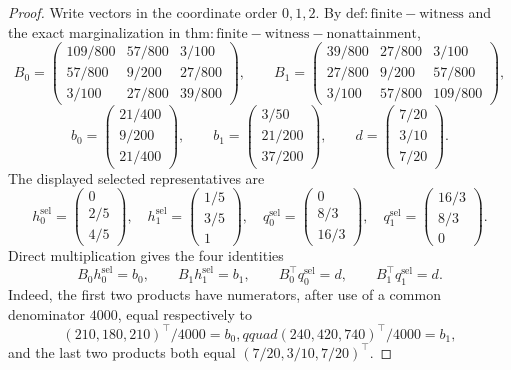 \documentclass{article}
\begin{document}
\begin{proof}
Write vectors in the coordinate order \(0,1,2\).  By \(\mathrm{def:finite-witness}\) and the exact marginalization in \(\mathrm{thm:finite-witness-nonattainment}\),
\[
B_0=\begin{pmatrix}
109/800&57/800&3/100\\
57/800&9/200&27/800\\
3/100&27/800&39/800
\end{pmatrix},\qquad
B_1=\begin{pmatrix}
39/800&27/800&3/100\\
27/800&9/200&57/800\\
3/100&57/800&109/800
\end{pmatrix},
\]
\[
b_0=\begin{pmatrix}21/400\\9/200\\21/400\end{pmatrix},\qquad
b_1=\begin{pmatrix}3/50\\21/200\\37/200\end{pmatrix},\qquad
d=\begin{pmatrix}7/20\\3/10\\7/20\end{pmatrix}.
\]
The displayed selected representatives are
\[
h_0^{\mathrm{sel}}=\begin{pmatrix}0\\2/5\\4/5\end{pmatrix},\quad
h_1^{\mathrm{sel}}=\begin{pmatrix}1/5\\3/5\\1\end{pmatrix},\quad
q_0^{\mathrm{sel}}=\begin{pmatrix}0\\8/3\\16/3\end{pmatrix},\quad
q_1^{\mathrm{sel}}=\begin{pmatrix}16/3\\8/3\\0\end{pmatrix}.
\]
Direct multiplication gives the four identities
\[
B_0h_0^{\mathrm{sel}}=b_0,\qquad
B_1h_1^{\mathrm{sel}}=b_1,
\qquad
B_0^\top q_0^{\mathrm{sel}}=d,\qquad
B_1^\top q_1^{\mathrm{sel}}=d.
\]
Indeed, the first two products have numerators, after use of a common denominator \(4000\), equal respectively to
\[
(210,180,210)^\top/4000=b_0,qquad
(240,420,740)^\top/4000=b_1,
\]
and the last two products both equal \((7/20,3/10,7/20)^\top\).


\end{proof}
\end{document}
